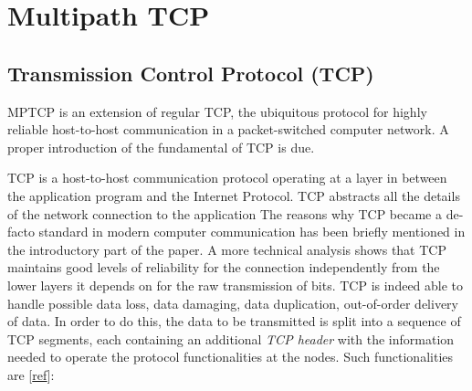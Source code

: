 \chapter{Multipath TCP}
\label{chap:multipathtcp}

\section{Transmission Control Protocol (TCP)}
MPTCP is an extension of regular TCP, the ubiquitous protocol for highly reliable host-to-host communication in a packet-switched computer network. A proper introduction of the fundamental of TCP is due.


TCP is a host-to-host communication protocol operating at a layer in between the application program and the Internet Protocol. TCP abstracts all the details of the network connection to the application 
The reasons why TCP became a de-facto standard in modern computer communication has been briefly mentioned in the introductory part of the paper. A more technical analysis shows that TCP maintains good levels of reliability for the connection independently from the lower layers it depends on for the raw transmission of bits. TCP is indeed able to handle possible data loss, data damaging, data duplication, out-of-order delivery of data. In order to do this, the data to be transmitted is split into a sequence of TCP segments, each containing an additional \textit{TCP header} with the information needed to operate the protocol functionalities at the nodes. Such functionalities are [\href{https://tools.ietf.org/html/rfc793}{ref}]:

